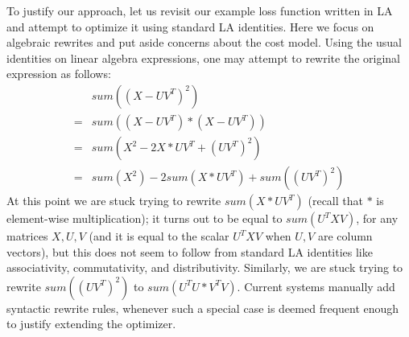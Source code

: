To justify our approach, let us revisit our example loss function
written in LA and attempt to optimize it using standard LA identities.
Here we focus on algebraic rewrites and put aside concerns about the
cost model. Using the usual identities on linear algebra expressions,
one may attempt to rewrite the original expression as follows:
\begin{align*}
& sum((X-UV^T)^2) \\
= &sum((X-UV^T)*(X-UV^T)) \\
=&sum(X^2-2X*UV^T+(UV^T)^2) \\
= & sum(X^2) - 2sum(X*UV^T) + sum((UV^T)^2)
\end{align*}
At this point we are stuck trying to rewrite $sum(X*UV^T)$ (recall
that $*$ is element-wise multiplication); it turns out to be equal to
$sum(U^TXV)$, for any matrices $X,U,V$ (and it is equal to the scalar
$U^TXV$ when $U, V$ are column vectors), but this does not seem to
follow from standard LA identities like associativity, commutativity,
and distributivity.  Similarly, we are stuck trying to rewrite
$sum((UV^T)^2)$ to $sum(U^TU * V^TV)$.  Current systems manually add
syntactic rewrite rules, whenever such a special case is deemed
frequent enough to justify extending the optimizer.


